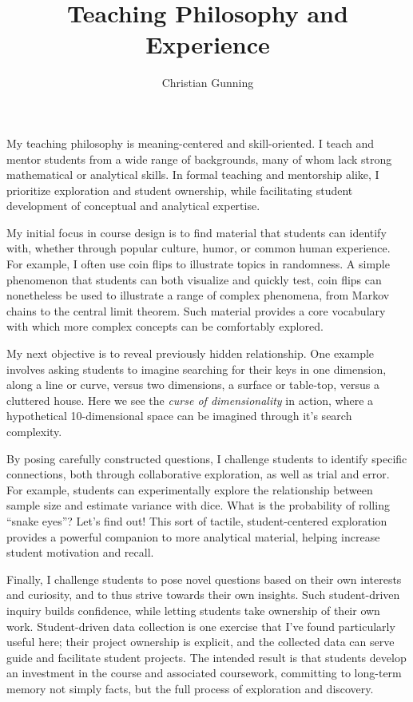 \documentclass[12pt]{article}
\author{Christian Gunning}
\title{Teaching Philosophy and Experience}
\begin{document}
\maketitle
\thispagestyle{empty}
\linespread{1.25}\selectfont

My teaching philosophy is meaning-centered and skill-oriented.
I teach and mentor students from a wide range of backgrounds, 
many of whom lack strong mathematical or analytical skills. 
In formal teaching and mentorship alike, I prioritize
exploration and student ownership, while facilitating
student development of conceptual and analytical expertise.

My initial focus in course design 
is to find material that students can identify with,
whether through popular culture, humor, or common human 
experience. For example, I often use coin flips to 
illustrate topics in randomness. A simple phenomenon 
that students can both visualize and quickly test, 
coin flips can nonetheless be used to illustrate a range 
of complex phenomena, from Markov chains to the central limit 
theorem. Such material provides a core vocabulary with 
which more complex concepts can be comfortably explored.

My next objective is to reveal previously hidden 
relationship. One example involves 
asking students to imagine searching for their keys 
in one dimension,
along a line or curve, versus two dimensions, a surface or
table-top, versus a cluttered house.  Here we see the {\em 
curse of dimensionality} in action, where a hypothetical 
10-dimensional space can be imagined through it's search 
complexity.  

By posing carefully constructed
questions, I challenge students to identify specific connections,
both through collaborative exploration, as well as trial and error.
For example, students can experimentally explore the relationship
between sample size and estimate variance with dice. What is the 
probability of rolling ``snake eyes''? Let's find out!
This sort of tactile, student-centered exploration provides 
a powerful companion to more analytical material, 
helping increase student motivation and recall.

Finally, I challenge students to pose novel questions based on
their own interests and curiosity, and to thus strive 
towards their own insights. 
Such student-driven inquiry builds confidence, 
while letting students take ownership of their own work.
Student-driven data collection is one exercise that I've
found particularly useful here; their project ownership is explicit,
and the collected data can serve guide and facilitate student
projects. The intended result is that students develop an investment 
in the course and associated coursework, committing to long-term 
memory not simply facts, but the full process of exploration and 
discovery.
\end{document}
